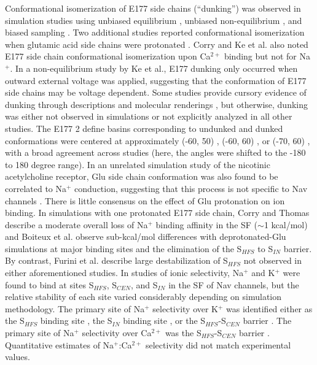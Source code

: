 \begin{refsection}
	Conformational isomerization of E177 side chains (``dunking'') was observed in simulation studies using unbiased equilibrium \cite{Ke:2014fy,Chakrabarti:2013kd}, unbiased non-equilibrium \cite{Ke:2014fy}, and biased sampling \cite{Domene:2015kj,Ngo:2016es,FinolUrdaneta:2014bz}.  Two additional studies reported conformational isomerization when glutamic acid side chains were protonated \cite{Boiteux:2014ut,Furini:2014gv}.  Corry \cite{Corry:2013hg} and Ke et al. \cite{Ke:2013ub} also noted E177 side chain conformational isomerization upon Ca$^{2+}$ binding but not for Na$^{+}$.  In a non-equilibrium study by Ke et al., E177 dunking only occurred when outward external voltage was applied, suggesting that the conformation of E177 side chains may be voltage dependent.  Some studies provide cursory evidence of dunking through descriptions and molecular renderings \cite{Ngo:2016es,FinolUrdaneta:2014bz}, but otherwise, dunking was either not observed in simulations or not explicitly analyzed in all other studies.  The E177 2 define basins corresponding to undunked and dunked conformations were centered at approximately (-60, 50) \cite{Domene:2015kj}, (-60, 60) \cite{Chakrabarti:2013kd}, or (-70, 60) \cite{Ke:2014fy,Boiteux:2014ut}, with a broad agreement across studies (here, the angles were shifted to the -180 to 180 degree range).  In an unrelated simulation study of the nicotinic acetylcholine receptor, Glu side chain conformation was also found to be correlated to Na$^{+}$ conduction, suggesting that this process is not specific to Nav channels \cite{Harpole:2014gu}.
There is little consensus on the effect of Glu protonation on ion binding.  In simulations with one protonated E177 side chain, Corry and Thomas \cite{Corry:2012ge} describe a moderate overall loss of Na$^{+}$ binding affinity in the SF ($\sim$1 kcal/mol) and Boiteux et al. \cite{Boiteux:2014ut} observe sub-kcal/mol differences with deprotonated-Glu simulations at major binding sites and the elimination of the S$_{HFS}$ to S$_{IN}$ barrier.  By contrast, Furini et al. \cite{Furini:2014gv} describe large destabilization of S$_{HFS}$ not observed in either aforementioned studies.
In studies of ionic selectivity, Na$^{+}$ and K$^{+}$ were found to bind at sites S$_{HFS}$, S$_{CEN}$, and S$_{IN}$ in the SF of Nav channels, but the relative stability of each site varied considerably depending on simulation methodology.  The primary site of Na$^{+}$ selectivity over K$^{+}$ was identified either as the S$_{HFS}$ binding site \cite{Corry:2012ge,Ngo:2016es}, the S$_{IN}$ binding site \cite{FinolUrdaneta:2014bz}, or the S$_{HFS}$-S$_{CEN}$ barrier \cite{Furini:2012jl,Domene:2015kj,Ulmschneider:2013da}.  The primary site of Na$^{+}$ selectivity over Ca$^{2+}$ was the S$_{HFS}$-S$_{CEN}$ barrier \cite{Ke:2013ub,Corry:2013hg}.  Quantitative estimates of Na$^{+}$:Ca$^{2+}$ selectivity did not match experimental values.
 

\end{refsection}
